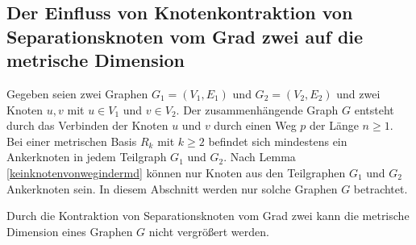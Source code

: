 \subsection{Der Einfluss von Knotenkontraktion von Separationsknoten vom Grad zwei auf die metrische Dimension}
Gegeben seien zwei Graphen $G_1=(V_1,E_1)$ und $G_2=(V_2,E_2)$ und zwei Knoten $u,v$ mit $u \in V_1$ und $v\in V_2$.
Der zusammenhängende Graph $G$ entsteht durch das Verbinden der Knoten $u$ und $v$ durch einen Weg $p$ der Länge $n \geq 1$. Bei einer metrischen Basis $R_k$ mit $k \geq 2$ befindet sich mindestens ein Ankerknoten in jedem Teilgraph $G_1$ und $G_2$. Nach Lemma \ref{keinknotenvonwegindermd} können nur Knoten aus den Teilgraphen $G_1$ und $G_2$ Ankerknoten sein. In diesem Abschnitt werden nur solche Graphen $G$ betrachtet.
\begin{lem}
\label{lem2}
\label{sepvertex}
Durch die Kontraktion von Separationsknoten vom Grad zwei kann die metrische Dimension eines Graphen $G$ nicht vergrößert werden.
\end{lem}
